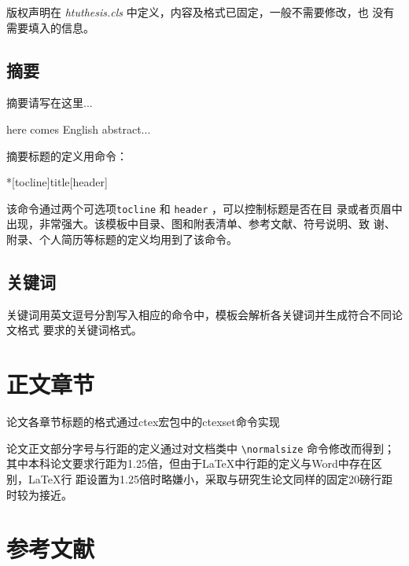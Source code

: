 版权声明在 \emph{htuthesis.cls} 中定义，内容及格式已固定，一般不需要修改，也
没有需要填入的信息。

\subsection*{摘要}

\begin{latex}
\begin{cabstract}
 摘要请写在这里...
\end{cabstract}
\begin{eabstract}
 here comes English abstract...
\end{eabstract}
\end{latex}

摘要标题的定义用命令：
\begin{latex}
[header]
\end{latex}
该命令通过两个可选项\texttt{tocline} 和 \texttt{header} ，可以控制标题是否在目
录或者页眉中出现，非常强大。该模板中目录、图和附表清单、参考文献、符号说明、致
谢、附录、个人简历等标题的定义均用到了该命令。

\subsection*{关键词}

关键词用英文逗号分割写入相应的命令中，模板会解析各关键词并生成符合不同论文格式
要求的关键词格式。
\begin{latex}
\end{latex}

\section{正文章节}
\label{sec:mainbody}

论文各章节标题的格式通过ctex宏包中的ctexset命令实现
\begin{latex}
\end{latex}

论文正文部分字号与行距的定义通过对文档类中 \verb|\normalsize| 命令修改而得到；
其中本科论文要求行距为1.25倍，但由于\LaTeX{}中行距的定义与Word中存在区别，\LaTeX{}行
距设置为1.25倍时略嫌小，采取与研究生论文同样的固定20磅行距时较为接近。

\section{参考文献}
\label{sec:bib}

